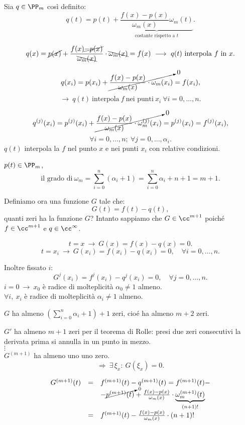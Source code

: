 \begin{dimo}Sia $q \in \PP_m$ così definito:
\[
q(t) = p(t) + \underbrace{\frac{f(x)-p(x)}{\omega_m(x)}
\omega_m(t)}_{\textrm{costante rispetto a }t}.
\]

\[
q(x) = \cancel{p(x)} +\frac{f(x) \cancel{- p(x)}}{\bcancel{\omega_m(x)}}\cdot
\bcancel{\omega_m(x)} = f(x)\ \longrightarrow \ q(t) \ \textrm{interpola}\ f 
\ \textrm{in}\ x.
\]

\[
q(x_i) = p(x_i) +\cancelto{0}{\frac{f(x)-p(x)}{\omega_m(x)}\cdot
\omega_m(x_i)} = f(x_i),\]\[ \longrightarrow \ q(t) \ \textrm{interpola}\ f 
\ \textrm{nei punti}\ x_i \ \forall i = 0, \ldots, n.
\]

\[
q^{(j)}(x_i) = p^{(j)}(x_i) + \cancelto{0}{\frac{f(x)-p(x)}{\omega_m(x)}\cdot
\omega^{(j)}_m(x_i)} = p^{(j)}(x_i) = f^{(j)}(x_i),\]
\[\forall i = 0, \ldots, n;\ \forall j = 0, \ldots, \alpha_i.
\]
$q(t)$ interpola la $f$ nel punto $x$ e nei punti $x_i$ con relative 
condizioni.

\begin{flushleft}
$p(t) \in \PP_m$,
\[\textrm{il grado di}\ \omega_m = \sum_{i = 0}^n \left(\alpha_i +1 \right) =
\sum_{i=0}^n\alpha_i+n+1 = m+1.\]
\end{flushleft}
Definiamo ora una funzione $G$ tale che:
\[G(t) = f(t)-q(t),\]
quanti zeri ha la funzione $G$? Intanto sappiamo che $G \in \cc^{m+1}$ poiché
$f \in \cc^{m+1}$ e $q \in \cc^{\infty}$.

\[t = x \ \longrightarrow \ G(x) = f(x) - q(x) = 0.\]
\[t = x_i \ \longrightarrow \ G(x_i) = f(x_i) - q(x_i) = 0, 
\quad \forall i = 0, \ldots, n.\]

Inoltre fissato $i$:
\[G^j(x_i) = f^j(x_i) - q^j(x_i) = 0, \quad \forall j=0,\ldots, n.\]
$i = 0 \ \longrightarrow \ x_0$ è radice di molteplicità $\alpha_0 \neq 1$ 
almeno.\\
$\forall i, \  x_i$ è radice di molteplicità $\alpha_i \neq 1$ 
almeno.\\
\begin{flushleft}
$G$ ha almeno $\left( \sum_{i=0}^n\alpha_i + 1\right) +1$ zeri, cioé ha almeno
$m+2$ zeri.
\end{flushleft}
$G'$ ha almeno $m+1$ zeri per il teorema di Rolle: presi due zeri consecutivi
la derivata prima si annulla in un punto in mezzo.\\
$\vdots$\\
$G^{(m+1)}$ ha almeno uno uno zero.
\[
\Longrightarrow\ \exists\, \xi_x \colon \ G(\xi_x) =0.
\]

\[
\begin{array}{lcl}
G^{(m+1)}(t) & = & f^{(m+1)}(t) - q^{(m+1)}(t) =  f^{(m+1)}(t) - \\ 
& & - \cancelto{0}{p^{(m+1)}(t)} + \frac{f(x)-p(x)}{\omega_m(x)}\cdot
\underbrace{\omega^{(m+1)}_m(t)}_{(n+1)!} \\
& = & f^{(m+1)}(t) -  \frac{f(x)-p(x)}{\omega_m(x)}\cdot(n+1)!
\end{array}\]


\end{dimo}
